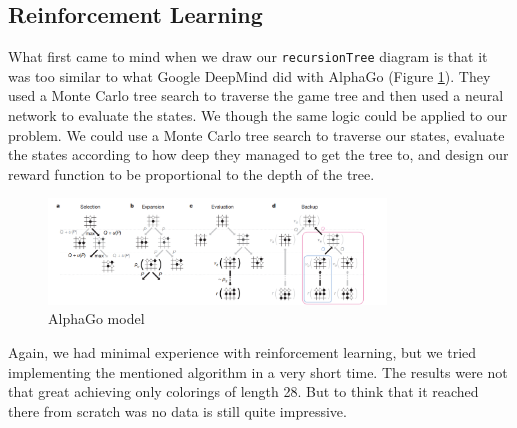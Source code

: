 \documentclass[12pt]{article}
\begin{document}
\subsection{Reinforcement Learning}
What first came to mind when we draw our \texttt{recursionTree} diagram is that it was too similar to what Google DeepMind did with AlphaGo (Figure \ref{fig:alphaGO}). They used a Monte Carlo tree search to traverse the game tree and then used a neural network to evaluate the states. We though the same logic could be applied to our problem. We could use a Monte Carlo tree search to traverse our states, evaluate the states according to how deep they managed to get the tree to, and design our reward function to be proportional to the depth of the tree. 
\begin{figure}[h]
    \centering
    \includegraphics[width=0.8\textwidth]{images/AlphaGo.png}
    \caption{AlphaGo model}
    \label{fig:alphaGO}
\end{figure}

Again, we had minimal experience with reinforcement learning, but we tried implementing the mentioned algorithm in a very short time. The results were not that great achieving only colorings of length 28. But to think that it reached there from scratch was no data is still quite impressive. 
\end{document}

